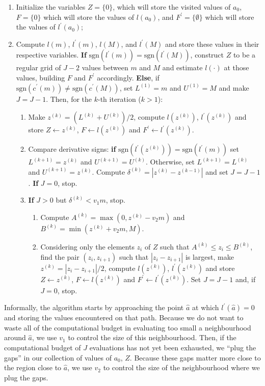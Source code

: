 \documentclass[a4paper, notitlepage, 11pt]{article}
\begin{document}
\begin{enumerate}
 \item Initialize the variables $Z = \{ 0\}$, which will store the visited values of $a_0$,  $F = \{ 0\}$ which will store the values of $l(a_0)$, and $F^{\prime} = \{ \emptyset \}$ which will store the values of $l^{\prime}(a_0)$;
 \item Compute $l(m)$, $l^\prime(m)$, $l(M)$, and $l^\prime(M)$ and store these values in their respective variables.
\textbf{If} $\text{sgn}(l^\prime(m)) = \text{sgn}(l^\prime(M))$, construct $Z$ to be a regular grid of $J - 2$ values between $m$ and $M$ and estimate $l(\cdot)$ at those values, building $F$ and $F^{\prime}$ accordingly. 
\textbf{Else}, if $\text{sgn}(c^\prime(m)) \neq \text{sgn}(c^\prime(M))$, set $L^{(1)} = m$ and $U^{(1)} = M$ and  make $J = J - 1$.
Then, for the $k$-th iteration ($k > 1$):
 \begin{enumerate}
 \item Make $z^{(k)} = (L^{(k)} + U^{(k)})/2$, compute $l(z^{(k)})$, $l^{\prime}(z^{(k)})$ and store $Z \leftarrow z^{(k)}$, $F \leftarrow l(z^{(k)})$ and $F^{\prime} \leftarrow l^{\prime}(z^{(k)})$.
 \item Compare derivative signs: \textbf{if} $ \text{sgn}(l^\prime(z^{(k)})) = \text{sgn}(l^\prime(m))$ set $L^{(k + 1)} = z^{(k)}$ and $U^{(k + 1)} = U^{(k)}$. 
 Otherwise, set $L^{(k + 1)} = L^{(k)}$ and $U^{(k + 1)} = z^{(k)}$. 
 Compute $\delta^{(k)} = |z^{(k)} - z^{(k-1)}|$ and set $J = J - 1$.
 \textbf{If} $J = 0$, stop.
 \item \textbf{If} $J > 0$ but $\delta^{(k)}  <  v_1 m $, stop.
 \begin{enumerate}
  \item Compute $A^{(k)} = \max(0, z^{(k)} - v_2m)$ and $ B^{(k)} = \min(z^{(k)} + v_2m, M)$.
  \item Considering only the elements $z_i$ of $Z$ such that $A^{(k)} \leq z_i \leq B^{(k)}$, find the pair $(z_i, z_{i + 1})$ such that $|z_{i} -z_{i + 1}|$ is largest, make $z^{(k)}  = |z_{i} -z_{i + 1}|/2$, compute $l(z^{(k)})$, $l^{\prime}(z^{(k)})$ and store $Z \leftarrow z^{(k)}$, $F \leftarrow l(z^{(k)})$ and $F^{\prime} \leftarrow l^{\prime}(z^{(k)})$.
  Set $J = J -1$ and, if $J = 0$, stop.
 \end{enumerate}
\end{enumerate}
\end{enumerate}
 
 Informally, the algorithm starts by approaching the point $\hat{a}$ at which $l^\prime(\hat{a}) = 0$ and storing the values encountered on that path.
 Because we do not want to waste all of the computational budget in evaluating too small a neighbourhood around $\hat{a}$, we use $v_1$ to control the size of this neighbourhood.
 Then, if the computational budget of $J$ evaluations has not yet been exhausted, we ``plug the gaps'' in our collection of values of $a_0$, $Z$.
 Because these gaps matter more close to the region close to $\hat{a}$, we use $v_2$ to control the size of the neighbourhood where we plug the gaps.
 
\end{document}
